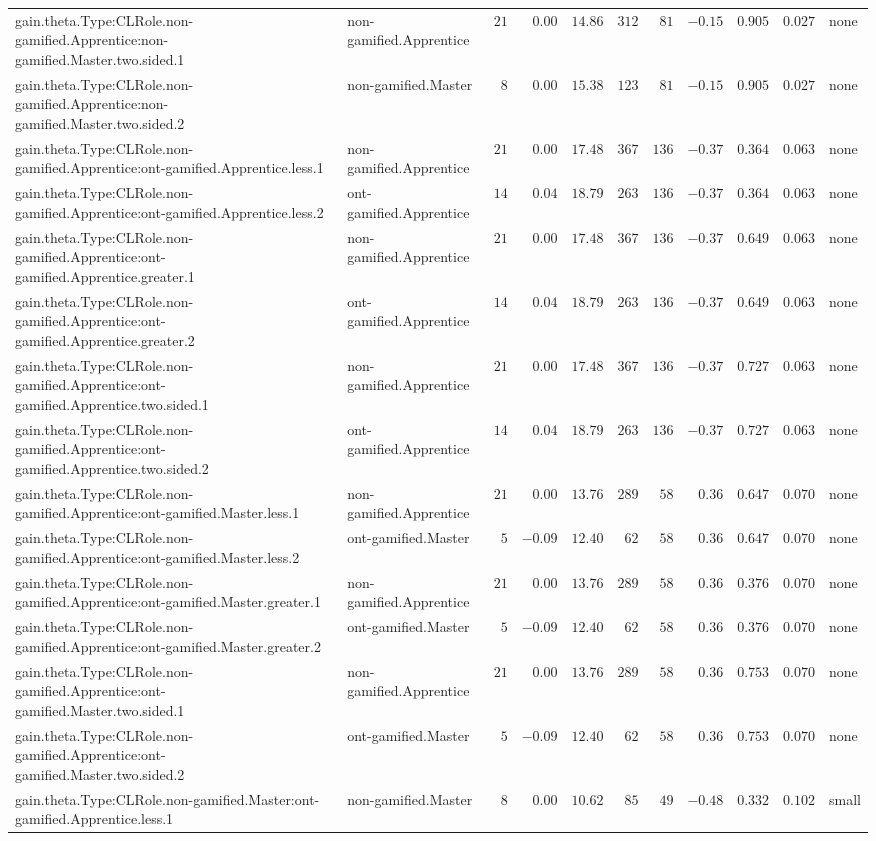 \documentclass[6pt]{article}
\begin{document}
\begin{landscape}
{\begin{longtable}{llrrrrrrrrl}
gain.theta.Type:CLRole.non-gamified.Apprentice:non-gamified.Master.two.sided.1&non-gamified.Apprentice&$21$&$ 0.00$&$14.86$&$312$&$ 81$&$-0.15$&$0.905$&$0.027$&none\tabularnewline
gain.theta.Type:CLRole.non-gamified.Apprentice:non-gamified.Master.two.sided.2&non-gamified.Master&$ 8$&$ 0.00$&$15.38$&$123$&$ 81$&$-0.15$&$0.905$&$0.027$&none\tabularnewline
gain.theta.Type:CLRole.non-gamified.Apprentice:ont-gamified.Apprentice.less.1&non-gamified.Apprentice&$21$&$ 0.00$&$17.48$&$367$&$136$&$-0.37$&$0.364$&$0.063$&none\tabularnewline
gain.theta.Type:CLRole.non-gamified.Apprentice:ont-gamified.Apprentice.less.2&ont-gamified.Apprentice&$14$&$ 0.04$&$18.79$&$263$&$136$&$-0.37$&$0.364$&$0.063$&none\tabularnewline
gain.theta.Type:CLRole.non-gamified.Apprentice:ont-gamified.Apprentice.greater.1&non-gamified.Apprentice&$21$&$ 0.00$&$17.48$&$367$&$136$&$-0.37$&$0.649$&$0.063$&none\tabularnewline
gain.theta.Type:CLRole.non-gamified.Apprentice:ont-gamified.Apprentice.greater.2&ont-gamified.Apprentice&$14$&$ 0.04$&$18.79$&$263$&$136$&$-0.37$&$0.649$&$0.063$&none\tabularnewline
gain.theta.Type:CLRole.non-gamified.Apprentice:ont-gamified.Apprentice.two.sided.1&non-gamified.Apprentice&$21$&$ 0.00$&$17.48$&$367$&$136$&$-0.37$&$0.727$&$0.063$&none\tabularnewline
gain.theta.Type:CLRole.non-gamified.Apprentice:ont-gamified.Apprentice.two.sided.2&ont-gamified.Apprentice&$14$&$ 0.04$&$18.79$&$263$&$136$&$-0.37$&$0.727$&$0.063$&none\tabularnewline
gain.theta.Type:CLRole.non-gamified.Apprentice:ont-gamified.Master.less.1&non-gamified.Apprentice&$21$&$ 0.00$&$13.76$&$289$&$ 58$&$ 0.36$&$0.647$&$0.070$&none\tabularnewline
gain.theta.Type:CLRole.non-gamified.Apprentice:ont-gamified.Master.less.2&ont-gamified.Master&$ 5$&$-0.09$&$12.40$&$ 62$&$ 58$&$ 0.36$&$0.647$&$0.070$&none\tabularnewline
gain.theta.Type:CLRole.non-gamified.Apprentice:ont-gamified.Master.greater.1&non-gamified.Apprentice&$21$&$ 0.00$&$13.76$&$289$&$ 58$&$ 0.36$&$0.376$&$0.070$&none\tabularnewline
gain.theta.Type:CLRole.non-gamified.Apprentice:ont-gamified.Master.greater.2&ont-gamified.Master&$ 5$&$-0.09$&$12.40$&$ 62$&$ 58$&$ 0.36$&$0.376$&$0.070$&none\tabularnewline
gain.theta.Type:CLRole.non-gamified.Apprentice:ont-gamified.Master.two.sided.1&non-gamified.Apprentice&$21$&$ 0.00$&$13.76$&$289$&$ 58$&$ 0.36$&$0.753$&$0.070$&none\tabularnewline
gain.theta.Type:CLRole.non-gamified.Apprentice:ont-gamified.Master.two.sided.2&ont-gamified.Master&$ 5$&$-0.09$&$12.40$&$ 62$&$ 58$&$ 0.36$&$0.753$&$0.070$&none\tabularnewline
gain.theta.Type:CLRole.non-gamified.Master:ont-gamified.Apprentice.less.1&non-gamified.Master&$ 8$&$ 0.00$&$10.62$&$ 85$&$ 49$&$-0.48$&$0.332$&$0.102$&small\tabularnewline

\end{longtable}}
\end{landscape}
\end{document}
